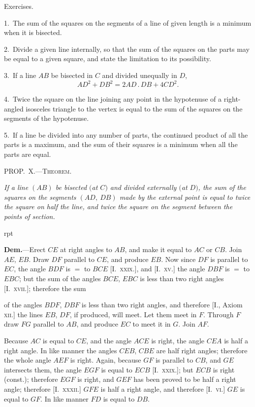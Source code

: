 \documentclass[oneside]{book}
\newcounter{wrapwidth}
\newcommand\mypropl[2]{
\bigskip\Needspace*{4\baselineskip}\begin{center}\textsc{#1}\end{center}
\hspace{\parindent}\emph{#2}\par\medskip
}
\newcommand\exhead[1]{
\Needspace*{5\baselineskip}\begin{center}
\textsf{#1}
\end{center}
}
\newcommand\imgflow[3]{
\setcounter{wrapwidth}{#1}

\begin{wrapfigure}[#2]{r}{\value{wrapwidth}pt}
\begin{center}
\vspace{-0.3in}

\end{center}
\end{wrapfigure}
}
\begin{document}
\exhead{Exercises.}

\begin{footnotesize}
1.~The sum of the squares on the segments of a line of given
length is a minimum when it is bisected.

2.~Divide a given line internally, so that the sum of the squares
on the parts may be equal to a given square, and state the limitation
to its possibility.

3.~If a line $AB$ be bisected in $C$ and divided unequally in $D$,
\[
  AD^2 + DB^2 =  2AD\,.\,DB + 4CD^2.
\]

4.~Twice the square on the line joining any point in the hypotenuse
of a right-angled isosceles triangle to the vertex is equal to
the sum of the squares on the segments of the hypotenuse.

5.~If a line be divided into any number of parts, the continued
product of all the parts is a maximum, and the sum of their squares
is a minimum when all the parts are equal.
\par\end{footnotesize}


\mypropl{PROP\@.~X.---Theorem.}{If a line $(AB)$ be bisected $($at $C)$ and divided externally
$($at $D)$, the sum of the squares on the segments $(AD,\ DB)$
made by the external point is equal to twice the square on
half the line, and twice the square on the segment between
the points of section.}


\imgflow{184}{11}{f092}

\textbf{Dem.}---Erect $CE$ at right angles to $AB$, and make
it equal to $AC$ or $CB$.
Join $AE$, $EB$. Draw
$DF$ parallel to $CE$, and
produce $EB$. Now
since $DF$ is parallel to
$EC$, the angle $BDF$ is
$=$ to $BCE$ [I.\ \textsc{xxix}.],
and [I.\ \textsc{xv}.] the angle
$DBF$ is $=$ to $EBC$;
but the sum of the
angles $BCE$, $EBC$ is
less than two right angles [I.\ \textsc{xvii}.]; therefore the sum

of the angles $BDF$, $DBF$ is less than two right angles,
and therefore [I., Axiom \textsc{xii}.] the lines $EB$, $DF$, if produced,
will meet. Let them meet in $F$. Through $F$
draw $FG$ parallel to $AB$, and produce $EC$ to meet it in
$G$. Join $AF$.

Because $AC$ is equal to $CE$, and the angle $ACE$ is right,
the angle $CEA$ is half a right angle. In like manner
the angles $CEB$, $CBE$ are half right angles; therefore
the whole angle $AEF$ is right. Again, because $GF$
is parallel to $CB$, and $GE$ intersects them, the angle $EGF$
is equal to $ECB$ [I.\ \textsc{xxix}.]; but $ECB$ is right (const.);
therefore $EGF$ is right, and $GEF$ has been proved to
be half a right angle; therefore [I.\ \textsc{xxxii}.] $GFE$ is
half a right angle, and therefore [I.\ \textsc{vi}.] $GE$ is equal
to $GF$. In like manner $FD$ is equal to $DB$.
\end{document}
